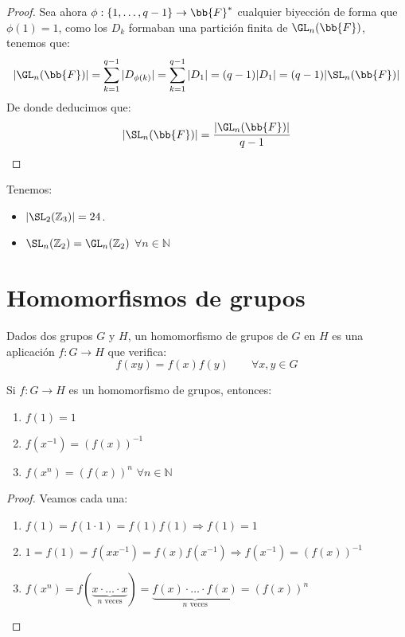 \begin{prop}
\begin{proof}
        \noindent
        Sea ahora $\phi:\{1,\ldots,q-1\}\to\bb{F}^\ast$ cualquier biyección de forma que $\phi(1)=1$, como los $D_k$ formaban una partición finita de $\GL_n(\bb{F})$, tenemos que:
        \begin{equation*}
            |\GL_n(\bb{F})| = \sum_{k=1}^{q-1}|D_{\phi(k)}| = \sum_{k=1}^{q-1}|D_1| = (q-1)|D_1| = (q-1)|\SL_n(\bb{F})|
        \end{equation*}
        De donde deducimos que:
        \begin{equation*}
            |\SL_n(\bb{F})| = \dfrac{|\GL_n(\bb{F})|}{q-1}
        \end{equation*}
    \end{proof}
\end{prop}

\begin{ejemplo}
    Tenemos:
    \begin{itemize}
        \item $|\SL_2(\mathbb{Z}_3)| = 24$.
        \item $\SL_n(\mathbb{Z}_2)=\GL_n(\mathbb{Z}_2)$ $\forall n\in \mathbb{N}$
    \end{itemize}
\end{ejemplo}

\section{Homomorfismos de grupos}
\begin{definicion}[Homomorfismo]
    Dados dos grupos $G$ y $H$, un homomorfismo de grupos de $G$ en $H$ es una aplicación $f:G\rightarrow H$ que verifica:
    \begin{equation*}
        f(xy) = f(x)f(y) \qquad \forall x,y\in G
    \end{equation*}
\end{definicion}

\begin{prop}
    Si $f:G\to H$ es un homomorfismo de grupos, entonces:
    \begin{enumerate}
        \item $f(1) = 1$
        \item $f(x^{-1}) = {(f(x))}^{-1}$
        \item $f(x^n) = {(f(x))}^{n}$ $\forall n\in \mathbb{N}$
    \end{enumerate}
    \begin{proof}
        Veamos cada una:
        \begin{enumerate}
            \item $f(1) = f(1\cdot 1) = f(1)f(1)\Longrightarrow f(1) = 1$
            \item $1 = f(1) = f(xx^{-1}) = f(x)f(x^{-1}) \Longrightarrow f(x^{-1}) = {(f(x))}^{-1}$
            \item $f(x^n) = f(\underbrace{x\cdot \ldots \cdot x}_{n \text{\ veces}}) = \underbrace{f(x)\cdot \ldots\cdot f(x)}_{n \text{\ veces}} = {(f(x))}^{n}$
        \end{enumerate}
    \end{proof}
\end{prop}

